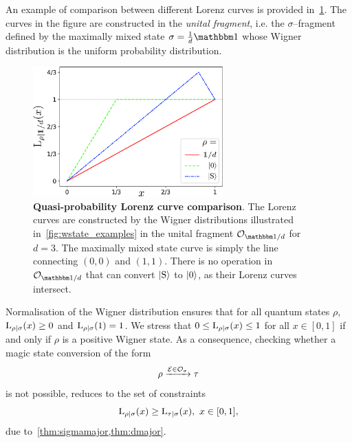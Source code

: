 \documentclass[pra,
aps,
twocolumn,
superscriptaddress,
groupedaddress,
nofootinbib,
reprint
]{revtex4-1}
\begin{document}
An example of comparison between different Lorenz curves is provided in~\cref{fig:lctoy}.
The curves in the figure are constructed in the \emph{unital fragment}, i.e. the $\sigma$--fragment defined by the maximally mixed state $\sigma = \frac{1}{d}\id$ whose Wigner distribution is the uniform probability distribution.
\begin{figure}
    \centering
    \includegraphics[height=5cm]{figs/lctoy.pdf}
    \caption{\textbf{Quasi-probability Lorenz curve comparison}.
    The Lorenz curves are constructed by the Wigner distributions illustrated in~\cref{fig:wstate_examples} in the unital fragment $\O_{\id/d}$ for $d=3$.
    The maximally mixed state curve is simply the line connecting $(0,0)$ and $(1,1)$.
    There is no operation in $\O_{\id/d}$ that can convert $\ket{\rm{S}}$ to $\ket{0}$, as their Lorenz curves intersect.
    }
    \label{fig:lctoy}
\end{figure}

Normalisation of the Wigner distribution ensures that for all quantum states $\rho$, ${{\rm{L}}_{\rho|\sigma}}(x) \geq 0$ and ${{\rm{L}}_{\rho|\sigma}}(1) = 1$.
We stress that $0 \leq {{\rm{L}}_{\rho|\sigma}}(x) \leq 1$ for all $x \in [0,1]$ if and only if $\rho$ is a positive Wigner state.
As a consequence, checking whether a magic state conversion of the form
\begin{equation}\label{eq:sigma_conv}
	\rho \xrightarrow{\mathcal{E} \in \mathcal{O}_\sigma} \tau
\end{equation} 
is not possible, reduces to the set of constraints
\begin{equation}\label{eq:majbound}
    {{\rm{L}}_{\rho|\sigma}}(x) \geq {{\rm{L}}_{\tau|\sigma}}(x),\ x\in [0,1],
\end{equation}
due to~\cref{thm:sigmamajor,thm:dmajor}.
\end{document}
